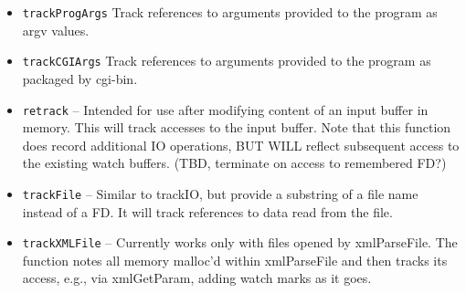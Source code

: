 \documentclass[titlepage]{article}
\begin{document}
\begin{itemize}
By default, RESim will use breakpoints on physical memory to track data.  It assumes that pages consitituing a given buffer are contiguous in physical memory.
This assumption often does not hold for larger buffers, but we make it in order to watch references by multiple processes to shared memory.  If dealing with large buffers,
use the {\tt force\_logical} flag to cause RESim to set breakpoints on logical addresses.

Use of the {\tt mark\_logs} option will include corresponding log entries from any use of {\tt traceFile} or {\tt TRACE\_BUFFERS} as watch marks.  This may help display diagnostics
within your watch mark list as parsing encounters errors.

The {\tt kbuf} option is used in conjunction with prepInjectWatch to record addresses of kernel buffers used when receiving the data.  Those kernel buffer addresses
are then referenced when injecting data into the kernel as described in \ref{prepInject}

Use an optional {\tt run=False} to prevent RESim from continuing the simulation, e.g., so that you can run commands such as ptime.

Use an optional {\tt commence=string} to delay data tracking until the received data starts with a given string.  This can be useful when a socket receives a lot of traffic and you
wish to focus on traffic that you are sending.  Use the commence\_offset parameter to skip N characters before testing for commence.  Do not use this along with kbuf.

Use {\tt max\_marks} to stop the simulation after a given number of watch marks are generated.

Use {\tt track\_calls} to generate watch marks for each syscall.

\item {\tt trackProgArgs} Track references to arguments provided to the program as argv values.

\item {\tt trackCGIArgs} Track references to arguments provided to the program as packaged by cgi-bin.

\item {\tt retrack} -- Intended for use after modifying content of an input buffer in memory.  This will track accesses to the input buffer.
Note that this function does record additional IO operations, BUT WILL reflect subsequent access to the existing watch buffers.  (TBD, terminate on access
to remembered FD?)

\item {\tt trackFile} -- Similar to trackIO, but provide a substring of a file name instead of a FD.  It will track references to data read from the file.
\item {\tt trackXMLFile} -- Currently works only with files opened by xmlParseFile. The function notes all memory malloc'd within
xmlParseFile and then tracks its access, e.g., via xmlGetParam, adding watch marks as it goes.


\end{itemize}
\end{document}
